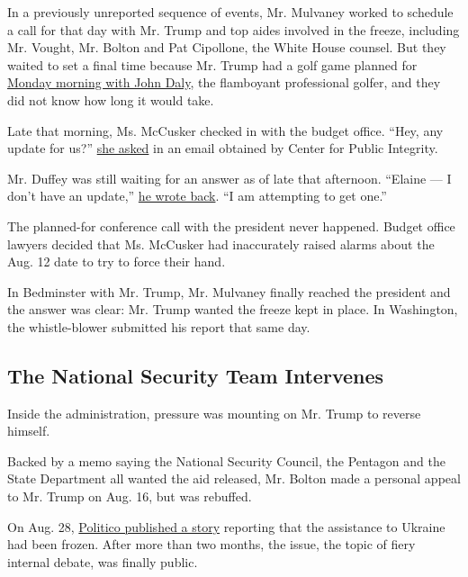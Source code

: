 In a previously unreported sequence of events, Mr. Mulvaney worked to
schedule a call for that day with Mr. Trump and top aides involved in
the freeze, including Mr. Vought, Mr. Bolton and Pat Cipollone, the
White House counsel. But they waited to set a final time because Mr.
Trump had a golf game planned for
\href{https://twitter.com/pga_johndaly/status/1161105208317026309?lang=en}{Monday
morning with John Daly}, the flamboyant professional golfer, and they
did not know how long it would take.

Late that morning, Ms. McCusker checked in with the budget office.
``Hey, any update for us?''
\href{https://www.documentcloud.org/documents/6592640-2019-08-12-ELAINE-to-DUFFEY-ANY-UPDATE-for-US.html}{she
asked} in an email obtained by Center for Public Integrity.

Mr. Duffey was still waiting for an answer as of late that afternoon.
``Elaine --- I don't have an update,''
\href{https://www.documentcloud.org/documents/6592640-2019-08-12-ELAINE-to-DUFFEY-ANY-UPDATE-for-US.html\#document/p1/a541467}{he
wrote back}. ``I am attempting to get one.''

The planned-for conference call with the president never happened.
Budget office lawyers decided that Ms. McCusker had inaccurately raised
alarms about the Aug. 12 date to try to force their hand.

In Bedminster with Mr. Trump, Mr. Mulvaney finally reached the president
and the answer was clear: Mr. Trump wanted the freeze kept in place. In
Washington, the whistle-blower submitted his report that same day.

\hypertarget{the-national-security-team-intervenes}{%
\subsection{The National Security Team
Intervenes}\label{the-national-security-team-intervenes}}

Inside the administration, pressure was mounting on Mr. Trump to reverse
himself.

Backed by a memo saying the National Security Council, the Pentagon and
the State Department all wanted the aid released, Mr. Bolton made a
personal appeal to Mr. Trump on Aug. 16, but was rebuffed.

On Aug. 28,
\href{https://www.politico.com/story/2019/08/28/trump-ukraine-military-aid-russia-1689531}{Politico
published a story} reporting that the assistance to Ukraine had been
frozen. After more than two months, the issue, the topic of fiery
internal debate, was finally public.

